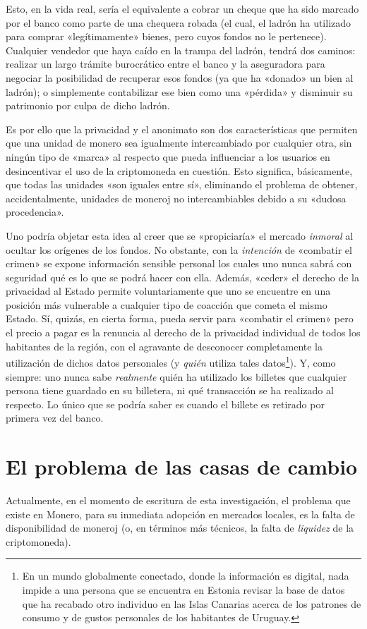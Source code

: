 \documentclass[12pt,a4paper,twoside]{book}
\begin{document}
Esto, en la vida real, sería el equivalente a cobrar un cheque que ha sido marcado por el banco como parte de una chequera robada (el cual, el ladrón ha utilizado para comprar «legítimamente» bienes, pero cuyos fondos no le pertenece). Cualquier vendedor que haya caído en la trampa del ladrón, tendrá dos caminos: realizar un largo trámite burocrático entre el banco y la aseguradora para negociar la posibilidad de recuperar esos fondos (ya que ha «donado» un bien al ladrón); o simplemente contabilizar ese bien como una «pérdida» y disminuir su patrimonio por culpa de dicho ladrón.

Es por ello que la privacidad y el anonimato son dos características que permiten que una unidad de monero sea igualmente intercambiado por cualquier otra, sin ningún tipo de «marca» al respecto que pueda influenciar a los usuarios en desincentivar el uso de la criptomoneda en cuestión. Esto significa, básicamente, que todas las unidades «son iguales entre sí», eliminando el problema de obtener, accidentalmente, unidades de moneroj no intercambiables debido a su «dudosa procedencia».

Uno podría objetar esta idea al creer que se «propiciaría» el mercado \textit{inmoral} al ocultar los orígenes de los fondos. No obstante, con la \textit{intención} de «combatir el crimen» se expone información sensible personal los cuales uno nunca sabrá con seguridad qué es lo que se podrá hacer con ella. Además, «ceder» el derecho de la privacidad al Estado permite voluntariamente que uno se encuentre en una posición más vulnerable a cualquier tipo de coacción que cometa el mismo Estado. Sí, quizás, en cierta forma, pueda servir para «combatir el crimen» pero el precio a pagar es la renuncia al derecho de la privacidad individual de todos los habitantes de la región, con el agravante de desconocer completamente la utilización de dichos datos personales (y \textit{quién} utiliza tales datos\footnote{En un mundo globalmente conectado, donde la información es digital, nada impide a una persona que se encuentra en Estonia revisar la base de datos que ha recabado otro individuo en las Islas Canarias acerca de los patrones de consumo y de gustos personales de los habitantes de Uruguay.}). Y, como siempre: uno nunca sabe \textit{realmente} quién ha utilizado los billetes que cualquier persona tiene guardado en su billetera, ni qué transacción se ha realizado al respecto. Lo único que se podría saber es cuando el billete es retirado por primera vez del banco.

\section{El problema de las casas de cambio}
Actualmente, en el momento de escritura de esta investigación, el problema que existe en Monero, para su inmediata adopción en mercados locales, es la falta de disponibilidad de moneroj (o, en términos más técnicos, la falta de \textit{liquidez} de la criptomoneda).
\end{document}
